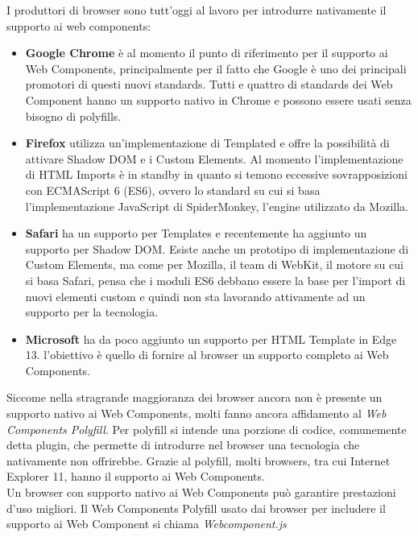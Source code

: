 I produttori di browser sono tutt’oggi al lavoro per introdurre nativamente il supporto ai web components:
\begin{itemize}
\item \textbf{Google Chrome} è al momento il punto di riferimento per il supporto ai Web Components, principalmente per il fatto che Google è uno dei principali promotori di questi nuovi standards. Tutti e quattro di standards dei Web Component hanno un supporto nativo in Chrome e possono essere usati senza bisogno di polyfills. 
\item \textbf{Firefox} utilizza un’implementazione di Templated e offre la possibilità di attivare Shadow DOM e i Custom Elements. Al momento l’implementazione di HTML Imports è in standby in quanto si temono eccessive sovrapposizioni con ECMAScript 6 (ES6), ovvero lo standard su cui si basa l’implementazione JavaScript di SpiderMonkey, l’engine utilizzato da Mozilla. 
\item \textbf{Safari} ha un supporto per Templates e recentemente ha aggiunto un supporto per Shadow DOM. Esiste anche un prototipo di implementazione di Custom Elements, ma come per Mozilla, il team di WebKit, il motore su cui si basa Safari, pensa che i moduli ES6 debbano essere la base per l’import di nuovi elementi custom e quindi non sta lavorando attivamente ad un supporto per la tecnologia.
\item \textbf{Microsoft} ha da poco aggiunto un supporto per HTML Template in Edge 13. l’obiettivo è quello di fornire al browser un supporto completo ai Web Components.
\end{itemize}
Siccome nella stragrande maggioranza dei browser ancora non è presente un supporto nativo ai Web Components, molti fanno ancora affidamento al \emph{Web Components Polyfill}.
Per polyfill si intende una porzione di codice, comunemente detta plugin, che permette di introdurre nel browser una tecnologia che nativamente non offrirebbe. 
Grazie al polyfill, molti browsers, tra cui Internet Explorer 11, hanno il supporto ai Web Components.
\\
Un browser con supporto nativo ai Web Components può garantire prestazioni d’uso migliori. Il Web Components Polyfill usato dai browser per includere il supporto ai Web Component si chiama \emph{Webcomponent.js}

